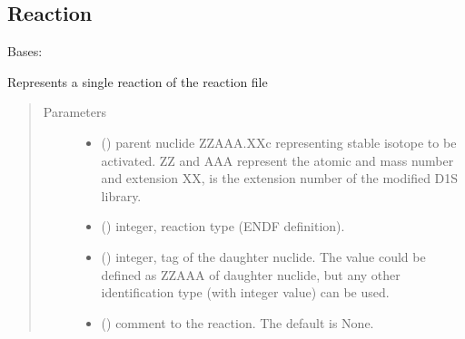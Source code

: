 \documentclass[letterpaper,10pt,english]{sphinxmanual}
\begin{document}
\subsection{Reaction}
\label{\detokenize{api/inputgeneration:reaction}}

\begin{fulllineitems}
\label{\detokenize{api/inputgeneration:parsersD1S.Reaction}}
Bases: 

Represents a single reaction of the reaction file
\begin{quote}\begin{description}
\item[{Parameters}] \leavevmode\begin{itemize}
\item {} 
 () \textendash{} parent nuclide ZZAAA.XXc representing stable isotope to be
activated. ZZ and AAA represent the atomic and mass number and
extension XX, is the extension number of the modified D1S library.

\item {} 
 () \textendash{} integer, reaction type (ENDF definition).

\item {} 
 () \textendash{} integer, tag of the daughter nuclide. The value could be
defined as ZZAAA of daughter nuclide, but any other identification
type (with integer value) can be used.

\item {} 
 (\sphinxstyleliteralemphasis{\sphinxupquote{, }}) \textendash{} comment to the reaction. The default is None.

\end{itemize}


\end{description}
\end{quote}
\end{fulllineitems}
\end{document}
